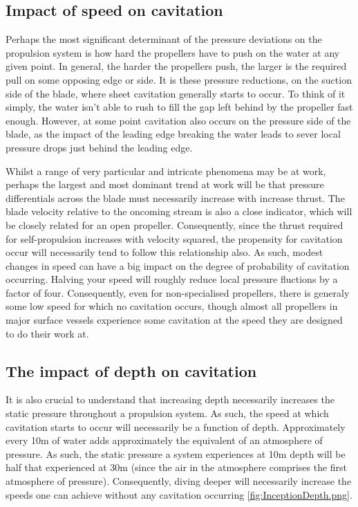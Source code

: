 \documentclass{article}\usepackage[]{graphicx}\usepackage[]{color}
\begin{document}
\subsection{Impact of speed on cavitation}
Perhaps the most significant determinant of the pressure deviations on the propulsion system is how hard the propellers have to push on the water at any given point.  In general, the harder the propellers push, the larger is the required pull on some opposing edge or side.  It is these pressure reductions, on the suction side of the blade, where sheet cavitation generally starts to occur.  To think of it simply, the water isn't able to rush to fill the gap left behind by the propeller fast enough.  However, at some point cavitation also occurs on the pressure side of the blade, as the impact of the leading edge breaking the water leads to sever local pressure drops just behind the leading edge.

Whilst a range of very particular and intricate phenomena may be at work, perhaps the largest and most dominant trend at work will be that pressure differentials across the blade must necessarily increase with increase thrust.  The blade velocity relative to the oncoming stream is also a close indicator, which will be closely related for an open propeller.  Consequently, since the thrust required for self-propulsion increases with velocity squared, the propensity for cavitation occur will necessarily tend to follow this relationship also.  As such, modest changes in speed can have a big impact on the degree of probability of cavitation occurring. Halving your speed will roughly reduce local pressure fluctions by a factor of four. Consequently, even for non-specialised propellers, there is generaly some low speed for which no cavitation occurs, though almost all propellers in major surface vessels experience some cavitation at the speed they are designed to do their work at.

\subsection{The impact of depth on cavitation}
It is also crucial to understand that increasing depth necessarily increases the static pressure throughout a propulsion system.  As such, the speed at which cavitation starts to occur will necessarily be a function of depth.  Approximately every 10m of water adds approximately the equivalent of an atmosphere of pressure.  As such, the static pressure a system experiences at 10m depth will be half that experienced at 30m (since the air in the atmosphere comprises the first atmosphere of pressure).  Consequently, diving deeper will necessarily increase the speeds one can achieve without any cavitation occurring \ref{fig:InceptionDepth.png}.
\end{document}
